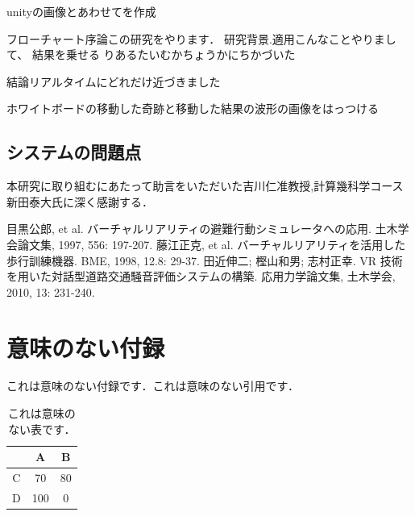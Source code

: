 \documentclass[dvipdfmx]{ampbt}
\def\numberofspines{1}
\begin{document}
unityの画像とあわせてを作成

フローチャート序論この研究をやります．
研究背景.適用こんなことやりまして、
結果を乗せる
りあるたいむかちょうかにちかづいた

結論リアルタイムにどれだけ近づきました

ホワイトボードの移動した奇跡と移動した結果の波形の画像をはっつける
\subsection{システムの問題点}

\clearpage
\acknowledgment
本研究に取り組むにあたって助言をいただいた吉川仁准教授,計算幾科学コース新田泰大氏に深く感謝する．

\begin{thebibliography}{10}
目黒公郎, et al. バーチャルリアリティの避難行動シミュレータへの応用. 土木学会論文集, 1997, 556: 197-207.
藤江正克, et al. バーチャルリアリティを活用した歩行訓練機器. BME, 1998, 12.8: 29-37.
田近伸二; 樫山和男; 志村正幸. VR 技術を用いた対話型道路交通騒音評価システムの構築. 応用力学論文集, 土木学会, 2010, 13: 231-240.
\end{thebibliography}

\appendix

\section{意味のない付録}
これは意味のない付録です．これは意味のない引用です\cite{polya1945}．

\begin{table}[htbp]
  \caption{これは意味のない表です．}
  \centering
  \begin{tabular}{c|cc}
      &  A  &  B \\
    \hline
    C &  70 & 80 \\
    D & 100 &  0
  \end{tabular}
\end{table}

\fi
\ifoutputcover
\cleardoublepage
\makecover                      %
\makespine[\numberofspines]     %
\fi
\ifoutputabstractforsubmission
\makeabstractforsubmission      %
\fi
\end{document}
